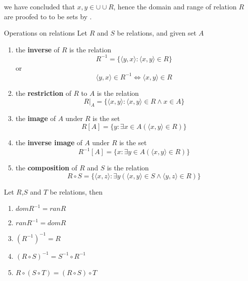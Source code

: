 \begin{remarks}
    we have concluded that $x, y \in \cup \cup R$, hence the domain and range of relation $R$ are proofed to to be sets by .
\end{remarks}

\begin{definition}{Operations on relations}{}
    Let $R$ and $S$ be relations, and given set $A$
    \begin{enumerate}

        \item the \textbf{inverse} of $R$ is the relation
        \begin{equation*}
            R^{-1} = \{\langle y,x \rangle : \langle x,y \rangle \in R\}
        \end{equation*}
        or
        \begin{equation*}
            \langle y,x \rangle \in R^{-1} \iff \langle x,y \rangle \in R
        \end{equation*}
        \item the \textbf{restriction} of $R$ to $A$ is the relation
        \begin{equation*}
            R \vert_{A} = \{\langle x,y \rangle : \langle x,y \rangle \in R \land x \in A\}
        \end{equation*}
        \item the \textbf{image} of $A$ under $R$ is the set
        \begin{equation*}
            R[A] = \{y : \exists x \in A (\langle x,y \rangle \in R)\}
        \end{equation*}
        \item the \textbf{inverse image} of $A$ under $R$ is the set
        \begin{equation*}
            R^{-1}[A] = \{x : \exists y \in A(\langle x,y \rangle \in R)\}
        \end{equation*}
        \item the \textbf{composition} of $R$ and $S$ is the relation
        \begin{equation*}
            R \circ S = \{\langle x,z \rangle : \exists y (\langle x,y \rangle \in S \land \langle y,z \rangle \in R)\}
        \end{equation*}
    \end{enumerate}
\end{definition}

\begin{proposition}{}{}
    Let $R$,$S$ and $T$ be relations, then
    \begin{enumerate}

        \item $dom R^{-1} = ran R$
        \item $ran R^{-1} = dom R$
        \item $(R^{-1})^{-1} = R$ 
        \item $(R \circ S)^{-1} = S^{-1} \circ R^{-1}$
        \item $R \circ (S \circ T) = (R \circ S) \circ T$

    \end{enumerate}
\end{proposition}

